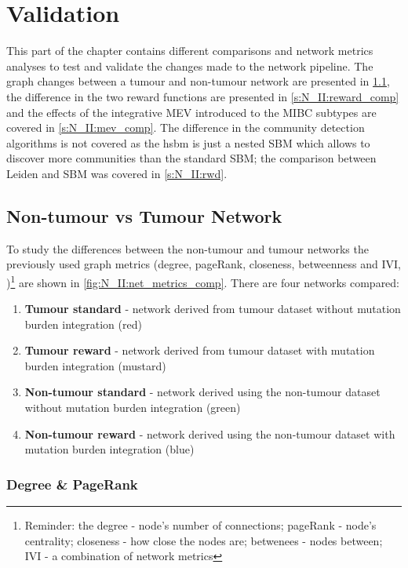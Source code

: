 \section{Validation} \label{s:N_II:validation}


This part of the chapter contains different comparisons and network metrics analyses to test and validate the changes made to the network pipeline. The graph changes between a tumour and non-tumour network are presented in \cref{s:N_II:net_comp}, the difference in the two reward functions are presented in \cref{s:N_II:reward_comp} and the effects of the integrative MEV introduced to the MIBC subtypes are covered in \cref{s:N_II:mev_comp}. The difference in the community detection algorithms is not covered as the \acrfull{hsbm} is just a nested SBM which allows to discover more communities than the standard SBM; the comparison between Leiden and SBM was covered in \cref{s:N_II:rwd}.


\subsection{Non-tumour vs Tumour Network} \label{s:N_II:net_comp}

To study the differences between the non-tumour and tumour networks the previously used graph metrics (degree, pageRank, closeness, betweenness and IVI,  )\footnote{Reminder: the degree - node's number of connections; pageRank - node's centrality;  closeness - how close the nodes are; betwenees - nodes between; IVI - a combination of network metrics} are shown in \cref{fig:N_II:net_metrics_comp}. There are four networks compared:
\begin{enumerate}
    \item \textbf{Tumour standard} - network derived from tumour dataset without mutation burden integration (red)
    \item \textbf{Tumour reward} - network derived from tumour dataset with mutation burden integration (mustard)
    \item \textbf{Non-tumour standard} - network derived using the non-tumour dataset without mutation burden integration (green)
    \item \textbf{Non-tumour reward} - network derived using the non-tumour dataset with mutation burden integration (blue)
\end{enumerate}


\subsubsection*{Degree \& PageRank}

